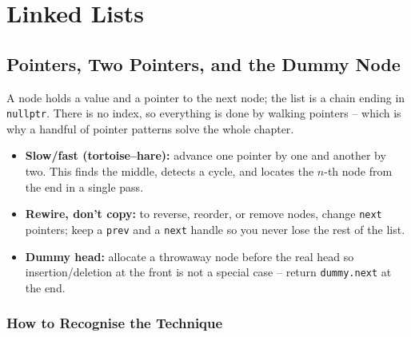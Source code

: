 \chapter{Linked Lists}

\section{Pointers, Two Pointers, and the Dummy Node}
\label{sec:ll-intro}

A node holds a value and a pointer to the next node; the list is a chain
ending in \texttt{nullptr}. There is no index, so everything is done by
walking pointers -- which is why a handful of pointer patterns solve the
whole chapter.

\begin{ideabox}
\begin{itemize}
  \item \textbf{Slow/fast (tortoise--hare):} advance one pointer by one and
        another by two. This finds the middle, detects a cycle, and locates
        the $n$-th node from the end in a single pass.
  \item \textbf{Rewire, don't copy:} to reverse, reorder, or remove nodes,
        change \texttt{next} pointers; keep a \texttt{prev} and a
        \texttt{next} handle so you never lose the rest of the list.
  \item \textbf{Dummy head:} allocate a throwaway node before the real head
        so insertion/deletion at the front is not a special case -- return
        \texttt{dummy.next} at the end.
\end{itemize}
\end{ideabox}

\subsection*{How to Recognise the Technique}

